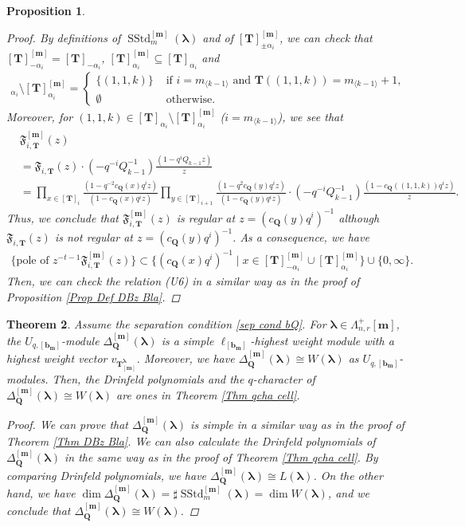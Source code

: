 \documentclass[12pt]{amsart}
\newtheorem{thm}{Theorem}[section]
\newtheorem{prop}[thm]{Proposition}
\numberwithin{equation}{thm}
\newcommand\bQ{\mathbf Q}
\newcommand\bT{\mathbf T}
\newcommand\bb{\mathbf b}
\renewcommand\bm{\mathbf m} %
\newcommand\fF{\mathfrak F}
\renewcommand\a{\alpha}  %
\newcommand\D{\Delta}
\newcommand\vL{\varLambda}
\newcommand\Bla{\boldsymbol\lambda}
\newcommand\lan{\langle}
\newcommand\ran{\rangle}
\newcommand{\SStd}{\operatorname{SStd}}
\newcounter{ni}
\begin{document}
\begin{prop}
\begin{proof}
By definitions of $\SStd_m^{[\bm]}(\Bla)$ and of $[\bT]_{\pm \a_i}^{[\bm]}$, 
we can check that 
$[\bT]_{-\a_i}^{[\bm]} = [\bT]_{-\a_i}$, 
$[\bT]_{\a_i}^{[\bm]} \subseteq [\bT]_{\a_i}$ and 
\begin{align*}
[\bT]_{\a_i} \setminus [\bT]_{\a_i}^{[\bm]} = \begin{cases} 
\{(1,1,k) \} & \text{ if } i= m_{\lan k-1 \ran} \text{ and } 
 	\bT((1,1,k)) = m_{\lan k-1 \ran} +1, 
\\ \emptyset & \text{ otherwise}.  
\end{cases}
\end{align*}
Moreover, 
for $ (1,1,k) \in [\bT]_{\a_i} \setminus [\bT]_{\a_i}^{[\bm]}$ ($i= m_{\lan k-1 \ran}$), 
we see that 
\begin{align*}
&\fF_{i, \bT}^{[\bm]} (z) 
\\
&= \fF_{i, \bT}(z) \cdot (-q^{-i} Q_{k-1}^{-1}) \frac{ (1- q^i Q_{k-1} z)}{z} 
\\
&= \prod_{ x \in [\bT]_i} \frac{ (1 - q^{-2} c_{\bQ} (x) q^i z)}{ (1 - c_{\bQ} (x) q^i z)} 
				\prod_{y \in [\bT]_{i+1}} \frac{(1 - q^2 c_{\bQ} (y) q^i z)}{( 1 - c_{\bQ} (y) q^i z )}
	\cdot (-q^{-i} Q_{k-1}^{-1}) \frac{ (1- c_{\bQ} ((1,1,k)) q^i  z)}{z}. 
\end{align*}
Thus, we conclude that $\fF_{i,\bT}^{[\bm]}(z)$ is regular at $z= (c_{\bQ} (y) q^i)^{-1}$ 
although $\fF_{i,\bT} (z)$ is not regular at $z= (c_{\bQ} (y) q^i)^{-1}$.
As a consequence, 
we have 
\begin{align*}
\{ \text{pole of } z^{-t-1} \fF_{i, \bT}^{[\bm]}(z) \} 
	\subset \{ (c_{\bQ}(x) q^i )^{-1} \mid x \in [\bT]_{- \a_i}^{[\bm]} \cup [\bT]_{\a_i}^{[\bm]} \} 
		\cup \{0, \infty\}.
\end{align*}
Then, we can check the relation (U6) in a similar way as in the proof of Proposition \ref{Prop Def DBz Bla}. 
\end{proof}
\end{prop}

\begin{thm}
\label{Thm DbQ bm iso W Bla}
Assume the separation condition \eqref{sep cond bQ}.  
For $\Bla \in \vL_{n,r}^+[\bm]$, 
the $U_{q,[\bb_{\bm}]}$-module $\D_{\bQ}^{[\bm]} (\Bla)$ is  a simple $\ell_{[\bb_{\bm}]}$-highest weight module 
with a highest weight vector $v_{\bT^{\Bla}_{[\bm]}}$. 
Moreover, we have  $\D_{\bQ}^{[\bm]}(\Bla) \cong W(\Bla)$ as $U_{q,[\bb_{\bm}]}$-modules. 
Then, the Drinfeld polynomials and  the $q$-character of $\D_{\bQ}^{[\bm]}(\Bla) \cong W(\Bla)$ 
are ones in Theorem \ref{Thm qcha cell}. 

\begin{proof}
We can prove that $\D_{\bQ}^{[\bm]}(\Bla)$ is simple in a similar way as in the proof of Theorem \ref{Thm DBz Bla}. 
We can also calculate the Drinfeld polynomials of $\D_{\bQ}^{[\bm]}(\Bla)$ in the same way 
as in the proof of Theorem \ref{Thm qcha cell}. 
By comparing Drinfeld polynomials, 
we have $\D_{\bQ}^{[\bm]}(\Bla) \cong L(\Bla)$. 
On the other hand, 
we have $\dim \D_{\bQ}^{[\bm]}(\Bla) = \sharp \SStd_m^{[\bm]}(\Bla) = \dim W(\Bla)$, 
and we conclude that $\D_{\bQ}^{[\bm]} (\Bla) \cong W(\Bla)$. 
\end{proof}
\end{thm}
\end{document}
